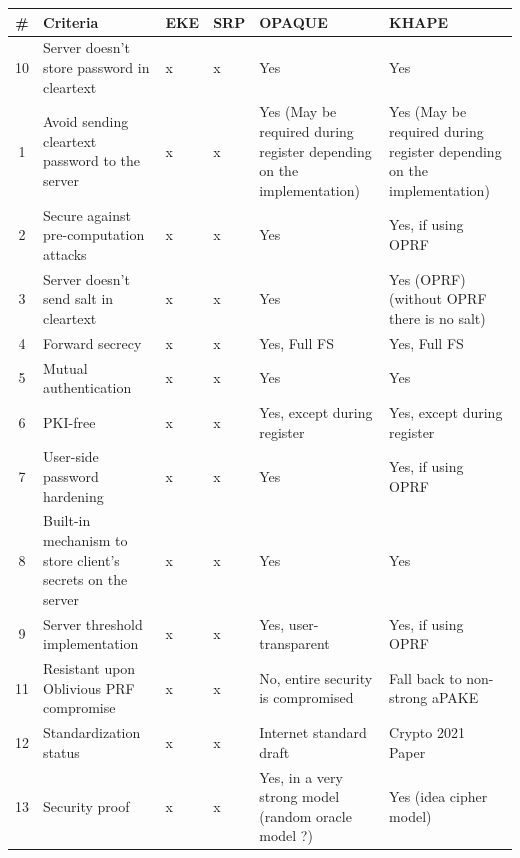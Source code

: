 \documentclass[../report.tex]{subfiles}
\begin{document}
\begin{center}
   \begin{tabular}{ | c | p{8cm} || p{1cm} | p{1cm} | p{2cm} | p{2cm} | }
     \hline
     \textbf{\#} & \textbf{Criteria} & \textbf{EKE} & \textbf{SRP} & \textbf{OPAQUE} & \textbf{KHAPE} \\ \hline
     
     
     
     10 & Server doesn't store password in cleartext & x & x & Yes & Yes \\ \hline
     1 & Avoid sending cleartext password to the server & x & x & Yes (May be required during register depending on the implementation) & Yes (May be required during register depending on the implementation) \\ \hline
     2 & Secure against pre-computation attacks & x & x & Yes & Yes, if using OPRF \\ \hline
     3 & Server doesn't send salt in cleartext & x & x & Yes & Yes (OPRF) (without OPRF there is no salt) \\ \hline
     4 & Forward secrecy & x & x & Yes, Full FS & Yes, Full FS \\ \hline
     5 & Mutual authentication & x & x & Yes & Yes \\ \hline
     6 & PKI-free & x & x & Yes, except during register & Yes, except during register \\ \hline
     7 & User-side password hardening & x & x & Yes & Yes, if using OPRF \\ \hline
     8 & Built-in mechanism to store client's secrets on the server & x & x & Yes & Yes \\ \hline
     9 & Server threshold implementation & x & x & Yes, user-transparent & Yes, if using OPRF \\ \hline
     11 & Resistant upon Oblivious PRF compromise & x & x & No, entire security is compromised & Fall back to non-strong aPAKE \\ \hline
     12 & Standardization status & x & x & Internet standard draft \cite{OPAQUE_Standard_Draft} & Crypto 2021 Paper \cite{KHAPE_Paper} \\ \hline
     13 & Security proof & x & x & Yes, in a very strong model (random oracle model ?) & Yes (idea cipher model) \\ \hline
     
     \end{tabular}
 \end{center}
 
\end{document}
